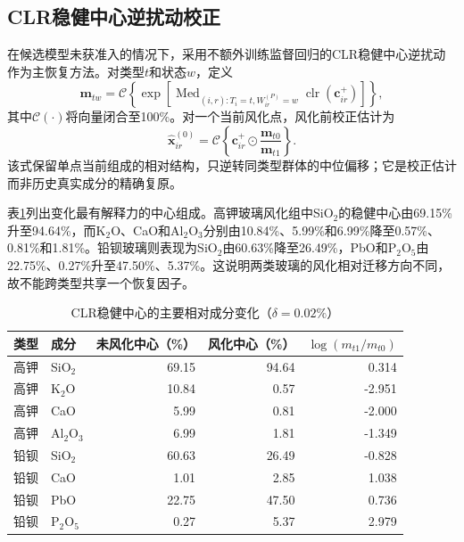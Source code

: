 \subsection{CLR稳健中心逆扰动校正}

在候选模型未获准入的情况下，采用不额外训练监督回归的CLR稳健中心逆扰动作为主恢复方法。对类型$t$和状态$w$，定义
\begin{equation}
    \mathbf m_{tw}=\mathcal C\!\left\{
        \exp\left[\operatorname{Med}_{(i,r):T_i=t,W_{ir}^{(P)}=w}
        \operatorname{clr}(\mathbf c_{ir}^{+})\right]\right\},
    \label{eq:p1-robust-center}
\end{equation}
其中$\mathcal C(\cdot)$将向量闭合至100\%。对一个当前风化点，风化前校正估计为
\begin{equation}
    \widehat{\mathbf x}_{ir}^{(0)}=
    \mathcal C\!\left\{\mathbf c_{ir}^{+}\odot
    \frac{\mathbf m_{t0}}{\mathbf m_{t1}}\right\}.
    \label{eq:p1-clr-restore}
\end{equation}
该式保留单点当前组成的相对结构，只逆转同类型群体的中位偏移；它是校正估计而非历史真实成分的精确复原。

表\ref{tab:p1-centers}列出变化最有解释力的中心组成。高钾玻璃风化组中SiO$_2$的稳健中心由69.15\%升至94.64\%，而K$_2$O、CaO和Al$_2$O$_3$分别由10.84\%、5.99\%和6.99\%降至0.57\%、0.81\%和1.81\%。铅钡玻璃则表现为SiO$_2$由60.63\%降至26.49\%，PbO和P$_2$O$_5$由22.75\%、0.27\%升至47.50\%、5.37\%。这说明两类玻璃的风化相对迁移方向不同，故不能跨类型共享一个恢复因子。

\begin{table}[H]
    \centering
    \caption{CLR稳健中心的主要相对成分变化（\(\delta=0.02\%\)）}
    \label{tab:p1-centers}
    \small
    \begin{tabular}{llrrr}
        \toprule
        类型 & 成分 & 未风化中心（\%） & 风化中心（\%） & $\log(m_{t1}/m_{t0})$ \\
        \midrule
        高钾 & SiO$_2$ & 69.15 & 94.64 & 0.314 \\
        高钾 & K$_2$O & 10.84 & 0.57 & -2.951 \\
        高钾 & CaO & 5.99 & 0.81 & -2.000 \\
        高钾 & Al$_2$O$_3$ & 6.99 & 1.81 & -1.349 \\
        铅钡 & SiO$_2$ & 60.63 & 26.49 & -0.828 \\
        铅钡 & CaO & 1.01 & 2.85 & 1.038 \\
        铅钡 & PbO & 22.75 & 47.50 & 0.736 \\
        铅钡 & P$_2$O$_5$ & 0.27 & 5.37 & 2.979 \\
        \bottomrule
    \end{tabular}
\end{table}

